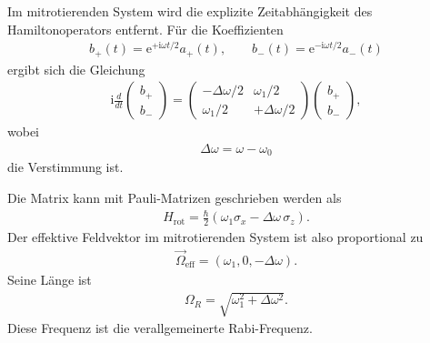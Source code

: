 \documentclass[11pt,a4paper]{scrartcl}
\newcommand{\e}{\mathrm e}
\newcommand{\ii}{\mathrm i}
\begin{document}
\begin{enumerate}[label=(\alph*)]
        \begin{calculationbox}
            Im mitrotierenden System wird die explizite Zeitabhängigkeit des Hamiltonoperators entfernt. Für die Koeffizienten
            \begin{align*}
                b_+(t)=\e^{+\ii\omega t/2}a_+(t),
                \qquad
                b_-(t)=\e^{-\ii\omega t/2}a_-(t)
            \end{align*}
            ergibt sich die Gleichung
            \begin{align*}
                \ii\frac{d}{dt}
                \begin{pmatrix}
                    b_+\\
                    b_-
                \end{pmatrix}
                =
                \begin{pmatrix}
                    -\Delta\omega/2 & \omega_1/2\\
                    \omega_1/2 & +\Delta\omega/2
                \end{pmatrix}
                \begin{pmatrix}
                    b_+\\
                    b_-
                \end{pmatrix},
            \end{align*}
            wobei
            \begin{align*}
                \Delta\omega=\omega-\omega_0
            \end{align*}
            die Verstimmung ist.

            \begin{calculationbox}[title=Effektiver Hamiltonoperator]
                Die Matrix kann mit Pauli-Matrizen geschrieben werden als
                \begin{align*}
                    H_{\mathrm{rot}}
                    =
                    \frac{\hbar}{2}
                    \left(
                        \omega_1\sigma_x
                        -
                        \Delta\omega\,\sigma_z
                    \right).
                \end{align*}
                Der effektive Feldvektor im mitrotierenden System ist also proportional zu
                \begin{align*}
                    \vec \Omega_{\mathrm{eff}}
                    =
                    \left(
                        \omega_1,
                        0,
                        -\Delta\omega
                    \right).
                \end{align*}
                Seine Länge ist
                \begin{align*}
                    \Omega_R
                    =
                    \sqrt{\omega_1^2+\Delta\omega^2}.
                \end{align*}
                Diese Frequenz ist die verallgemeinerte Rabi-Frequenz.
            \end{calculationbox}


\end{calculationbox}
\end{enumerate}
\end{document}
